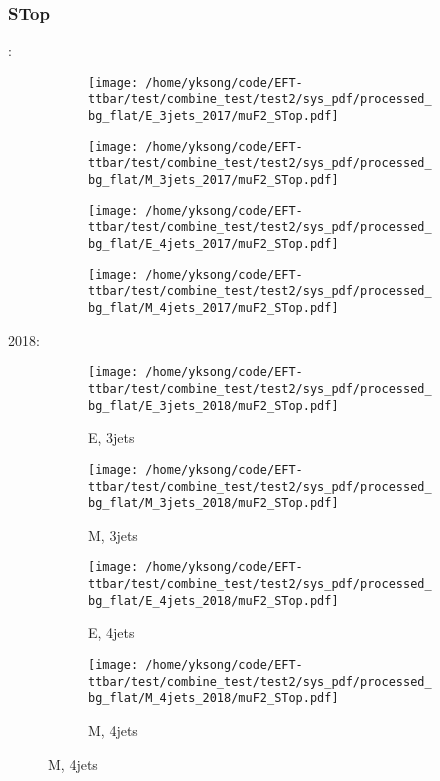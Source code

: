 \documentclass{beamer}
\begin{document}
\begin{frame}
\frametitle{STop}
\fontsize{5}{1}:
\begin{figure}
\centering
\begin{subfigure}[b]{0.24\textwidth}
\texttt{[image: /home/yksong/code/EFT-ttbar/test/combine\_test/test2/sys\_pdf/processed\_bg\_flat/E\_3jets\_2017/muF2\_STop.pdf]}
\end{subfigure}
\begin{subfigure}[b]{0.24\textwidth}
\texttt{[image: /home/yksong/code/EFT-ttbar/test/combine\_test/test2/sys\_pdf/processed\_bg\_flat/M\_3jets\_2017/muF2\_STop.pdf]}
\end{subfigure}
\begin{subfigure}[b]{0.24\textwidth}
\texttt{[image: /home/yksong/code/EFT-ttbar/test/combine\_test/test2/sys\_pdf/processed\_bg\_flat/E\_4jets\_2017/muF2\_STop.pdf]}
\end{subfigure}
\begin{subfigure}[b]{0.24\textwidth}
\texttt{[image: /home/yksong/code/EFT-ttbar/test/combine\_test/test2/sys\_pdf/processed\_bg\_flat/M\_4jets\_2017/muF2\_STop.pdf]}
\end{subfigure}
\end{figure}
2018:
\begin{figure}
\centering
\begin{subfigure}[b]{0.24\textwidth}
\texttt{[image: /home/yksong/code/EFT-ttbar/test/combine\_test/test2/sys\_pdf/processed\_bg\_flat/E\_3jets\_2018/muF2\_STop.pdf]}
\captionsetup{font=tiny}
\caption{E, 3jets}
\end{subfigure}
\begin{subfigure}[b]{0.24\textwidth}
\texttt{[image: /home/yksong/code/EFT-ttbar/test/combine\_test/test2/sys\_pdf/processed\_bg\_flat/M\_3jets\_2018/muF2\_STop.pdf]}
\captionsetup{font=tiny}
\caption{M, 3jets}
\end{subfigure}
\begin{subfigure}[b]{0.24\textwidth}
\texttt{[image: /home/yksong/code/EFT-ttbar/test/combine\_test/test2/sys\_pdf/processed\_bg\_flat/E\_4jets\_2018/muF2\_STop.pdf]}
\captionsetup{font=tiny}
\caption{E, 4jets}
\end{subfigure}
\begin{subfigure}[b]{0.24\textwidth}
\texttt{[image: /home/yksong/code/EFT-ttbar/test/combine\_test/test2/sys\_pdf/processed\_bg\_flat/M\_4jets\_2018/muF2\_STop.pdf]}
\captionsetup{font=tiny}
\caption{M, 4jets}
\end{subfigure}
\end{figure}
\end{frame}
\end{document}
